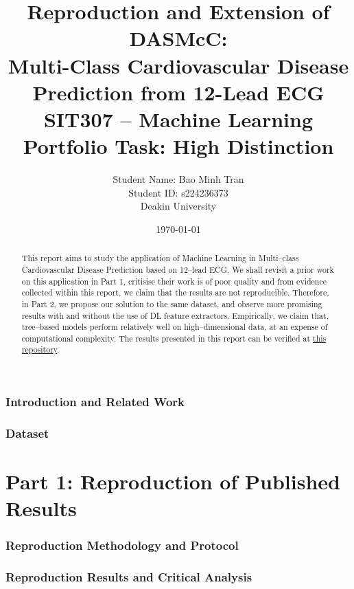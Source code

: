 \documentclass[11pt,a4paper]{article}
\title{\textbf{Reproduction and Extension of DASMcC: \\
       Multi-Class Cardiovascular Disease Prediction from 12-Lead ECG}\\[6pt]
       \large {SIT307 -- Machine Learning \\ Portfolio Task: High Distinction}}
\author{Student Name: Bao Minh Tran \\
 Student ID: s224236373 \\
  Deakin University}
\date{\today}
\theoremstyle{definition}
\theoremstyle{remark}
\begin{document}


\begin{abstract}
\noindent
This report aims to study the application of Machine Learning in Multi–class Cardiovascular Disease Prediction based on 12–lead ECG.
We shall revisit a prior work on this application in Part 1, critisise their work is of poor quality and from evidence collected within this report, we claim that the results are not reproducible.
Therefore, in Part 2, we propose our solution to the same dataset, and observe more promising results with and without the use of DL feature extractors.
Empirically, we claim that, tree–based models perform relatively well on high–dimensional data, at an expense of computational complexity.
The results presented in this report can be verified at \href{https://github.com/Trminh06-work/Improved-DASMcC.git}{this repository}.
\end{abstract}


\setcounter{tocdepth}{2}
\tableofcontents
\newpage

\section{Introduction and Related Work}


\section{Dataset}


\newpage
\part*{Part 1: Reproduction of Published Results}
\label{sec:part_1}

\section{Reproduction Methodology and Protocol}


\section{Reproduction Results and Critical Analysis}

\end{document}

